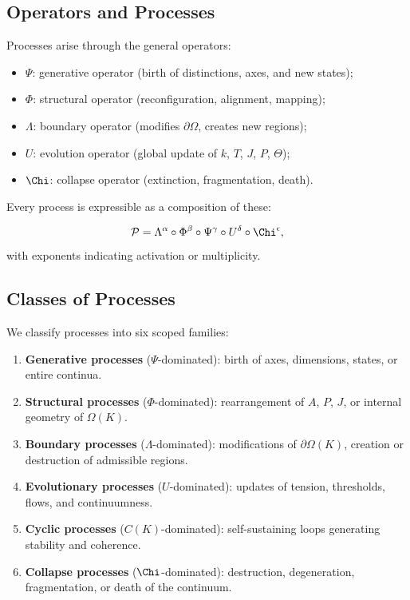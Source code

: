\subsection{Operators and Processes}

Processes arise through the general operators:

\begin{itemize}
    \item $\Psi$: generative operator (birth of distinctions, axes, and new states);
    \item $\Phi$: structural operator (reconfiguration, alignment, mapping);
    \item $\Lambda$: boundary operator (modifies $\partial\Omega$, creates new regions);
    \item $U$: evolution operator (global update of $k$, $T$, $J$, $P$, $\Theta$);
    \item $\Chi$: collapse operator (extinction, fragmentation, death).
\end{itemize}

Every process is expressible as a composition of these:

\[
\mathcal{P} = 
\Lambda^{\alpha} \circ \Phi^{\beta} \circ \Psi^{\gamma} 
\circ U^{\delta} \circ \Chi^{\epsilon},
\]
with exponents indicating activation or multiplicity.

\subsection{Classes of Processes}

We classify processes into six scoped families:

\begin{enumerate}
    \item \textbf{Generative processes} ($\Psi$-dominated):  
    birth of axes, dimensions, states, or entire continua.
    
    \item \textbf{Structural processes} ($\Phi$-dominated):  
    rearrangement of $A$, $P$, $J$, or internal geometry of $\Omega(K)$.

    \item \textbf{Boundary processes} ($\Lambda$-dominated):  
    modifications of $\partial\Omega(K)$, creation or destruction of
    admissible regions.

    \item \textbf{Evolutionary processes} ($U$-dominated):  
    updates of tension, thresholds, flows, and continuumness.

    \item \textbf{Cyclic processes} ($C(K)$-dominated):  
    self-sustaining loops generating stability and coherence.

    \item \textbf{Collapse processes} ($\Chi$-dominated):  
    destruction, degeneration, fragmentation, or death of the continuum.
\end{enumerate}

